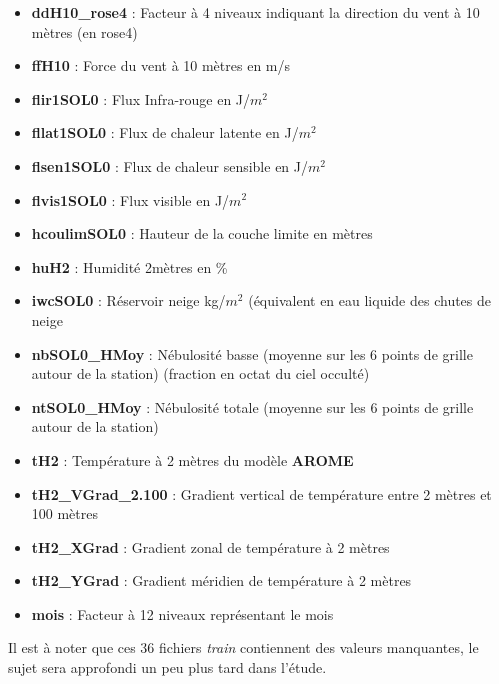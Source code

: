 \documentclass[14pt, openany]{article}
\begin{document}
\begin{itemize}
\item \textbf{ddH10\_rose4} : Facteur à 4 niveaux indiquant la direction du vent à 10 mètres (en rose4)
\item \textbf{ffH10} : Force du vent à 10 mètres en m/s
\item \textbf{flir1SOL0} : Flux Infra-rouge en J/$m^2$
\item \textbf{fllat1SOL0} : Flux de chaleur latente en J/$m^2$
\item \textbf{flsen1SOL0} : Flux de chaleur sensible en J/$m^2$
\item \textbf{flvis1SOL0} : Flux visible en J/$m^2$
\item \textbf{hcoulimSOL0} : Hauteur de la couche limite en mètres
\item \textbf{huH2} : Humidité 2mètres en \%
\item \textbf{iwcSOL0} : Réservoir neige kg/$m^2$ (équivalent en eau liquide des chutes de neige
\item \textbf{nbSOL0\_HMoy} : Nébulosité basse (moyenne sur les 6 points de grille autour de la station) (fraction en octat du ciel occulté)
\item \textbf{ntSOL0\_HMoy} : Nébulosité totale (moyenne sur les 6 points de grille autour de la station)
\item \textbf{tH2} : Température à 2 mètres du modèle \textbf{AROME}
\item \textbf{tH2\_VGrad\_2.100} : Gradient vertical de température entre 2 mètres et 100 mètres
\item \textbf{tH2\_XGrad} : Gradient zonal de température à 2 mètres
\item \textbf{tH2\_YGrad} : Gradient méridien de température à 2 mètres
\item \textbf{mois} : Facteur à 12 niveaux représentant le mois
\end{itemize}
Il est à noter que ces 36 fichiers \textit{train} contiennent des valeurs manquantes, le sujet sera approfondi un peu plus tard dans l'étude.
\end{document}
